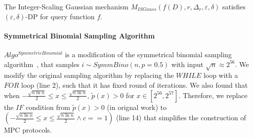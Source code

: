 \begin{theorem}
    The Integer-Scaling Gaussian mechanism $M_{ISGauss}\left(f\left(D\right),r,\Delta_r,\varepsilon,\delta\right)$ satisfies $ \left(\varepsilon,\delta\right) $-DP for query function $f$.
\end{theorem}



\paragraph{Symmetrical Binomial Sampling Algorithm}
\label{para:BinarySearchBasedGeometricSamplingAlgorithm}

$Algo^{SymmetricBinomial}$ is a modification of the symmetrical binomial sampling algorithm~\cite{googleDP2019}, that samples $i\sim SymmBino\left(n,p=0.5\right) $ with input $\sqrt{n}\approx 2^{56}$. We modify the original sampling algorithm by replacing the $WHILE$ loop with a $FOR$ loop (line 2), such that it has fixed round of iterations. We also found that when $-\frac{\sqrt{n\ln n}}{2} \leq x \leq \frac{\sqrt{n\ln n}}{2}$, $\tilde{p}\left(x\right)>0$ for $x \in [2^{56},2^{57}]$. Therefore, we replace the $IF$ condition from $\tilde{p}\left(x\right)>0$ (in orignal work) to $\left(-\frac{\sqrt{n\ln n}}{2} \leq x \leq \frac{\sqrt{n\ln n}}{2} \land c==1\right) $ (line 14) that simplifies the construction of MPC protocols.

